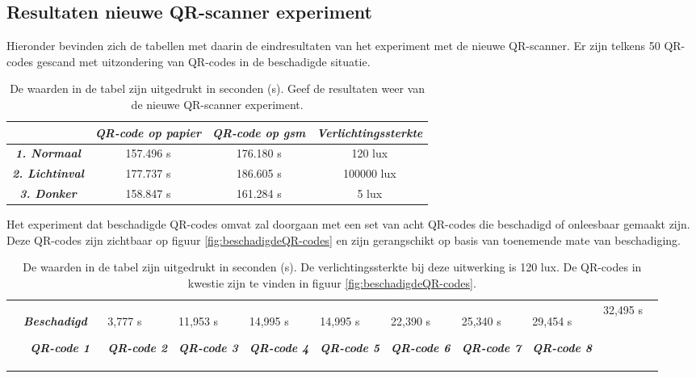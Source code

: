 \subsection{Resultaten nieuwe QR-scanner experiment}
\label{sec:nieuweUitwerkingExperiment}

Hieronder bevinden zich de tabellen met daarin de eindresultaten van het experiment met de nieuwe QR-scanner. Er zijn telkens 50 QR-codes gescand met uitzondering van QR-codes in de beschadigde situatie.

\begin{table}[h]
    \centering
    \begin{tabular}{ c|c|c|c }
        \cline{2-4}
        & \textbf{\textit{QR-code op papier}} & \textbf{\textit{QR-code op gsm}} & \textbf{\textit{Verlichtingssterkte}} \\
        \cline{2-4}        
        \hline
        \textbf{\textit{1. Normaal}} & 157.496 s & 176.180 s & 120 lux \\
        \hline
        \textbf{\textit{2. Lichtinval}} & 177.737 s & 186.605 s & 100000 lux \\
        \hline
        \textbf{\textit{3. Donker}} & 158.847 s & 161.284 s & 5 lux \\
        \hline        
    \end{tabular}
    \captionsetup{justification=centering}
    \caption{De waarden in de tabel zijn uitgedrukt in seconden (s). Geef de resultaten weer van de nieuwe QR-scanner experiment.}
    \label{tab:3expeQR-scanner}
\end{table}

Het experiment dat beschadigde QR-codes omvat zal doorgaan met een set van acht QR-codes die beschadigd of onleesbaar gemaakt zijn. Deze QR-codes zijn zichtbaar op figuur \ref{fig:beschadigdeQR-codes} en zijn gerangschikt op basis van toenemende mate van beschadiging.

\begin{table}[h]
    \centering
    \begin{tabular}{ c|c }
        & \textbf{\textit{Beschadigd}} \
        \cline{2-2}
        \textbf{\textit{QR-code 1}} & 3,777 s \
        \textbf{\textit{QR-code 2}} & 11,953 s \
        \textbf{\textit{QR-code 3}} & 14,995 s \
        \textbf{\textit{QR-code 4}} & 14,995 s \
        \textbf{\textit{QR-code 5}} & 22,390 s \
        \textbf{\textit{QR-code 6}} & 25,340 s \
        \textbf{\textit{QR-code 7}} & 29,454 s \
        \textbf{\textit{QR-code 8}} & 32,495 s \
    \end{tabular}
    \captionsetup{justification=centering}
    \caption{De waarden in de tabel zijn uitgedrukt in seconden (s). De verlichtingssterkte bij deze uitwerking is 120 lux. De QR-codes in kwestie zijn te vinden in figuur \ref{fig:beschadigdeQR-codes}.}
    \label{tab:omgezette_tabel2}
\end{table}

